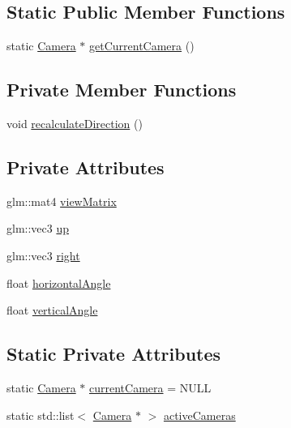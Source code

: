 \subsection*{Static Public Member Functions}
\begin{DoxyCompactItemize}
\item 
static \hyperlink{class_g_g_e_1_1_camera}{Camera} $\ast$ \hyperlink{class_g_g_e_1_1_camera_ae92af63f3737bc869e94e5f4703fbaa6}{get\+Current\+Camera} ()
\end{DoxyCompactItemize}
\subsection*{Private Member Functions}
\begin{DoxyCompactItemize}
\item 
void \hyperlink{class_g_g_e_1_1_camera_aba9d72d5688c3a8d7aa5eff868ef8c3b}{recalculate\+Direction} ()
\end{DoxyCompactItemize}
\subsection*{Private Attributes}
\begin{DoxyCompactItemize}
\item 
glm\+::mat4 \hyperlink{class_g_g_e_1_1_camera_a221e30f65f6ea2f56effe0f49d788a62}{view\+Matrix}
\item 
glm\+::vec3 \hyperlink{class_g_g_e_1_1_camera_a48d161f43a6c2d8a39048bae3d0e1c89}{up}
\item 
glm\+::vec3 \hyperlink{class_g_g_e_1_1_camera_af9a93409b55b7d6fcc5c6ccf20d146fe}{right}
\item 
float \hyperlink{class_g_g_e_1_1_camera_af4ce4bd9320cb90a96279e89e971f414}{horizontal\+Angle}
\item 
float \hyperlink{class_g_g_e_1_1_camera_a15ada6665d1e31494ee175f1668e7655}{vertical\+Angle}
\end{DoxyCompactItemize}
\subsection*{Static Private Attributes}
\begin{DoxyCompactItemize}
\item 
static \hyperlink{class_g_g_e_1_1_camera}{Camera} $\ast$ \hyperlink{class_g_g_e_1_1_camera_a500bf2297f52a16911d453c2d8a4dafc}{current\+Camera} = N\+U\+L\+L
\item 
static std\+::list$<$ \hyperlink{class_g_g_e_1_1_camera}{Camera} $\ast$ $>$ \hyperlink{class_g_g_e_1_1_camera_a0840a832e6d94923576520715a1e5933}{active\+Cameras}
\end{DoxyCompactItemize}

